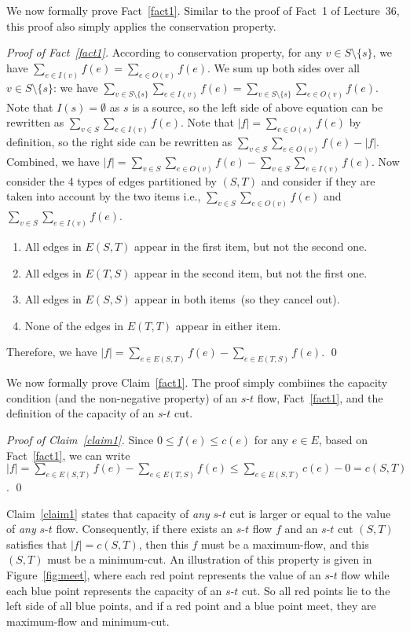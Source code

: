 We now formally prove Fact~\ref{fact1}. 
Similar to the proof of Fact~1 of Lecture~36, this proof also simply applies the conservation property.

\emph{Proof of Fact~\ref{fact1}.} According to conservation property, for any $v\in S\setminus \{s\}$,
we have $\sum_{e\in I(v)} f(e) = \sum_{e\in O(v)} f(e)$. 
We sum up both sides over all $v\in S\setminus\{s\}$: 
we have $\sum_{v\in S\setminus\{s\}} \sum_{e\in I(v)} f(e) = \sum_{v\in S\setminus\{s\}} \sum_{e\in O(v)} f(e)$. 
Note that $I(s) = \emptyset$ as $s$ is a source, so the left side of above equation can be rewritten as $\sum_{v\in S} \sum_{e\in I(v)} f(e)$.
Note that $|f| = \sum_{e\in O(s)} f(e)$ by definition, so the right side can be rewritten as $\sum_{v\in S} \sum_{e\in O(v)} f(e) - |f|$.
Combined, we have $|f| = \sum_{v\in S} \sum_{e\in O(v)} f(e) - \sum_{v\in S} \sum_{e\in I(v)} f(e)$. 
Now consider the 4 types of edges partitioned by $(S, T)$ and consider if they are taken into account by the two items
i.e., $\sum_{v\in S} \sum_{e\in O(v)} f(e)$ and $\sum_{v\in S} \sum_{e\in I(v)} f(e)$. 
\vspace*{-\topsep}
\begin{enumerate}
\item All edges in $E(S, T)$ appear in the first item, but not the second one.
\item All edges in $E(T, S)$ appear in the second item, but not the first one.
\item All edges in $E(S, S)$ appear in both items~(so they cancel out).
\item None of the edges in $E(T, T)$ appear in either item.
\end{enumerate}
Therefore, we have $|f| = \sum_{e\in E(S, T)} f(e) - \sum_{e\in E(T, S)} f(e)$. \qed

We now formally prove Claim~\ref{fact1}. The proof simply combiines the capacity condition (and the non-negative property) of an $s$-$t$ flow,
Fact~\ref{fact1}, and the definition of the capacity of an $s$-$t$ cut.

\emph{Proof of Claim~\ref{claim1}.} Since $0\le f(e) \le c(e)$ for any $e\in E$,
based on Fact~\ref{fact1}, we can write
$|f| = \sum_{e\in E(S, T)} f(e) - \sum_{e\in E(T, S)} f(e)
\le \sum_{e\in E(S, T)} c(e) - 0 = c(S, T)$. \qed

Claim~\ref{claim1} states that capacity of \emph{any} $s$-$t$ cut
is larger or equal to the value of \emph{any} $s$-$t$ flow.
Consequently, if there exists an $s$-$t$ flow $f$ and an $s$-$t$ cut $(S,T)$
satisfies that $|f| = c(S, T)$, then this $f$ must be a maximum-flow,
and this $(S, T)$ must be a minimum-cut.
An illustration of this property is given in Figure~\ref{fig:meet},
where each red point represents the value of an $s$-$t$ flow
while each blue point represents the capacity of an $s$-$t$ cut.
So all red points lie to the left side of all blue points,
and if a red point and a blue point meet, they are maximum-flow and minimum-cut.

